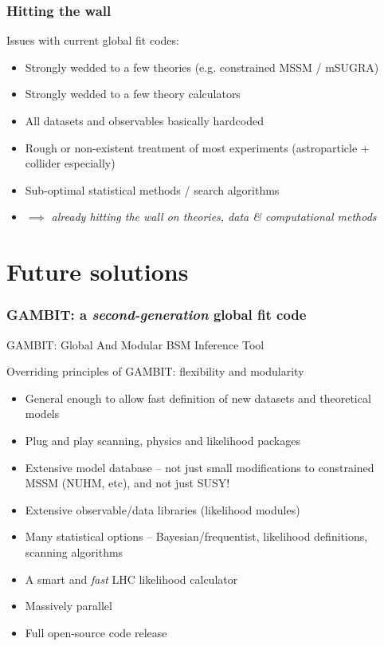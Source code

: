 \documentclass[xcolor=dvipsnames]{beamer}
\begin{document}
\begin{frame}
\frametitle{Hitting the wall}

Issues with current global fit codes:
\begin{itemize}
\item Strongly wedded to a few theories (e.g. constrained MSSM / mSUGRA)
\item Strongly wedded to a few theory calculators
\item All datasets and observables basically hardcoded
\item Rough or non-existent treatment of most experiments (astroparticle + collider especially)
\item Sub-optimal statistical methods / search algorithms
\item $\implies$ \textit{already hitting the wall on theories, data \& computational methods}
\end{itemize}

\end{frame}

\section{Future solutions}

\begin{frame}
\frametitle{\textbf{GAMBIT}: a \textit{second-generation} global fit code}

GAMBIT: \alert{G}lobal \alert{A}nd \alert{M}odular \alert{B}SM \alert{I}nference \alert{T}ool
\vspace{5mm}

Overriding principles of GAMBIT: flexibility and modularity
\begin{itemize}
\item General enough to allow fast definition of new datasets and theoretical models
\item Plug and play scanning, physics and likelihood packages
\item Extensive model database -- not just small modifications to constrained MSSM (NUHM, etc), and not just SUSY!
\item Extensive observable/data libraries (likelihood modules)
\item Many statistical options -- Bayesian/frequentist, likelihood definitions, scanning algorithms
\item A smart and \textit{fast} LHC likelihood calculator
\item Massively parallel
\item Full open-source code release
\end{itemize}

\end{frame}
\end{document}
